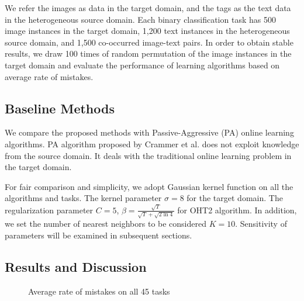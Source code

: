 \documentclass[letterpaper]{article}
\begin{document}
We refer the images as data in the target domain, and the tags as the text data in the heterogeneous source domain.
Each binary classification task has 500 image instances in the target domain, 1,200 text instances in the heterogeneous source domain, and 1,500 co-occurred image-text pairs.
In order to obtain stable results, we draw 100 times of random permutation of the image instances in the target domain and evaluate the performance of learning algorithms based on average rate of mistakes.

\subsection{Baseline Methods}
We compare the proposed methods with Passive-Aggressive (PA) online learning algorithms.
PA algorithm proposed by Crammer et al. does not exploit knowledge from the source domain.
It deals with the traditional online learning problem in the target domain.

For fair comparison and simplicity, we adopt Gaussian kernel function on all the algorithms and tasks.
The kernel parameter $\sigma = 8$ for the target domain.
The regularization parameter $C = 5$, $ \beta = \frac{\sqrt{T}}{\sqrt{T}+\sqrt{2\ln{4}}} $ for OHT2 algorithm.
In addition, we set the number of nearest neighbors to be considered $K = 10$.
Sensitivity of parameters will be examined in subsequent sections.

\subsection{Results and Discussion}
\begin{figure}[!htb]
\centering
  \caption{Average rate of mistakes on all 45 tasks}
  \label{Average rate of mistakes on all 45 tasks}
\end{figure}
\end{document}
